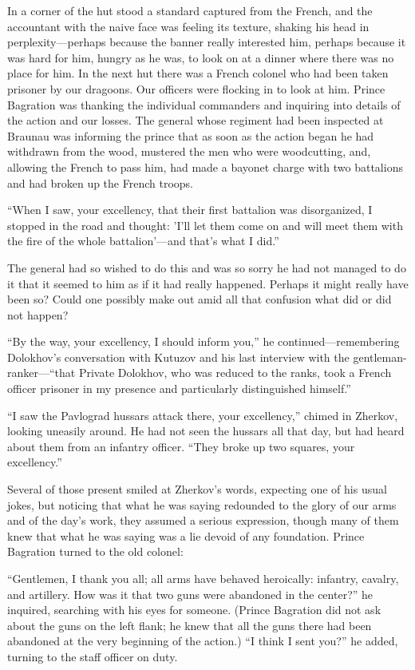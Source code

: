 In a corner of the hut stood a standard captured from the French,
and the accountant with the naive face was feeling its texture,
shaking his head in perplexity---perhaps because the banner
really interested him, perhaps because it was hard for him,
hungry as he was, to look on at a dinner where there was no place
for him. In the next hut there was a French colonel who had been
taken prisoner by our dragoons. Our officers were flocking in to
look at him. Prince Bagration was thanking the individual
commanders and inquiring into details of the action and our
losses. The general whose regiment had been inspected at Braunau
was informing the prince that as soon as the action began he had
withdrawn from the wood, mustered the men who were woodcutting,
and, allowing the French to pass him, had made a bayonet charge
with two battalions and had broken up the French troops.

``When I saw, your excellency, that their first battalion was
disorganized, I stopped in the road and thought: 'I'll let them
come on and will meet them with the fire of the whole
battalion'---and that's what I did.''

The general had so wished to do this and was so sorry he had not
managed to do it that it seemed to him as if it had really
happened. Perhaps it might really have been so? Could one
possibly make out amid all that confusion what did or did not
happen?

``By the way, your excellency, I should inform you,'' he
continued---remembering Dolokhov's conversation with Kutuzov and
his last interview with the gentleman-ranker---``that Private
Dolokhov, who was reduced to the ranks, took a French officer
prisoner in my presence and particularly distinguished himself.''

``I saw the Pavlograd hussars attack there, your excellency,''
chimed in Zherkov, looking uneasily around. He had not seen the
hussars all that day, but had heard about them from an infantry
officer. ``They broke up two squares, your excellency.''

Several of those present smiled at Zherkov's words, expecting one
of his usual jokes, but noticing that what he was saying
redounded to the glory of our arms and of the day's work, they
assumed a serious expression, though many of them knew that what
he was saying was a lie devoid of any foundation. Prince
Bagration turned to the old colonel:

``Gentlemen, I thank you all; all arms have behaved heroically:
infantry, cavalry, and artillery. How was it that two guns were
abandoned in the center?'' he inquired, searching with his eyes
for someone. (Prince Bagration did not ask about the guns on the
left flank; he knew that all the guns there had been abandoned at
the very beginning of the action.)  ``I think I sent you?'' he
added, turning to the staff officer on duty.

